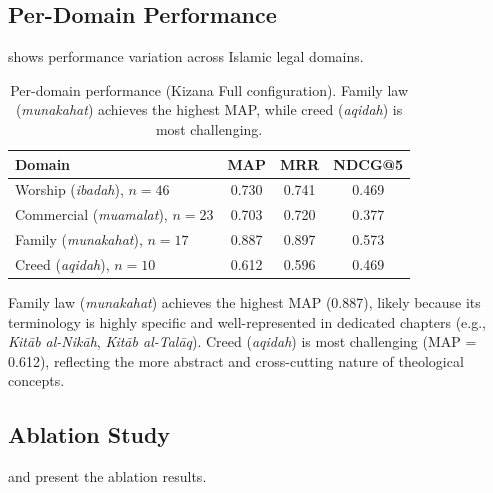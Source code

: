 \documentclass[preprint,12pt,authoryear]{elsarticle}
\begin{document}
\subsection{Per-Domain Performance}

 shows performance variation across Islamic legal domains.

\begin{table}[t]
\centering
\caption{Per-domain performance (Kizana Full configuration). Family law (\textit{munakahat}) achieves the highest MAP, while creed (\textit{aqidah}) is most challenging.}
\label{tab:per-domain}
\begin{tabular}{lccc}
\toprule
Domain & MAP & MRR & NDCG@5 \\
\midrule
Worship (\textit{ibadah}), $n=46$ & 0.730 & 0.741 & 0.469 \\
Commercial (\textit{muamalat}), $n=23$ & 0.703 & 0.720 & 0.377 \\
Family (\textit{munakahat}), $n=17$ & 0.887 & 0.897 & 0.573 \\
Creed (\textit{aqidah}), $n=10$ & 0.612 & 0.596 & 0.469 \\
\bottomrule
\end{tabular}
\end{table}

Family law (\textit{munakahat}) achieves the highest MAP (0.887), likely because its terminology is highly specific and well-represented in dedicated chapters (e.g., \textit{Kit\={a}b al-Nik\={a}h}, \textit{Kit\={a}b al-Tal\={a}q}). Creed (\textit{aqidah}) is most challenging (MAP = 0.612), reflecting the more abstract and cross-cutting nature of theological concepts.

\subsection{Ablation Study}

 and  present the ablation results.
\end{document}
